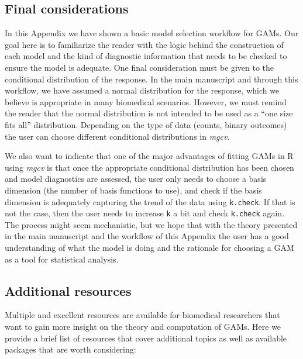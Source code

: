 \documentclass[
]{article}
\newcommand{\passthrough}[1]{#1}
\begin{document}
\hypertarget{final-considerations}{%
\subsection{Final considerations}\label{final-considerations}}

In this Appendix we have shown a basic model selection workflow for GAMs. Our goal here is to familiarize the reader with the logic behind the construction of each model and the kind of diagnostic information that needs to be checked to ensure the model is adequate. One final consideration must be given to the conditional distribution of the response. In the main manuscript and through this workflow, we have assumed a normal distribution for the response, which we believe is appropriate in many biomedical scenarios. However, we must remind the reader that the normal distribution is not intended to be used as a ``one size fits all'' distribution. Depending on the type of data (counts, binary outcomes) the user can choose different conditional distributions in \emph{mgcv}.

We also want to indicate that one of the major advantages of fitting GAMs in R using \emph{mgcv} is that once the appropriate conditional distribution has been chosen and model diagnostics are assessed, the user only needs to choose a basis dimension (the number of basis functions to use), and check if the basis dimension is adequately capturing the trend of the data using \passthrough{\lstinline!k.check!}. If that is not the case, then the user needs to increase \passthrough{\lstinline!k!} a bit and check \passthrough{\lstinline!k.check!} again. The process might seem mechanistic, but we hope that with the theory presented in the main manuscript and the workflow of this Appendix the user has a good understanding of what the model is doing and the rationale for choosing a GAM as a tool for statistical analysis.

\hypertarget{additional-resources}{%
\subsection{Additional resources}\label{additional-resources}}

Multiple and excellent resources are available for biomedical researchers that want to gain more insight on the theory and computation of GAMs. Here we provide a brief list of resources that cover additional topics as well as available packages that are worth considering:
\end{document}

